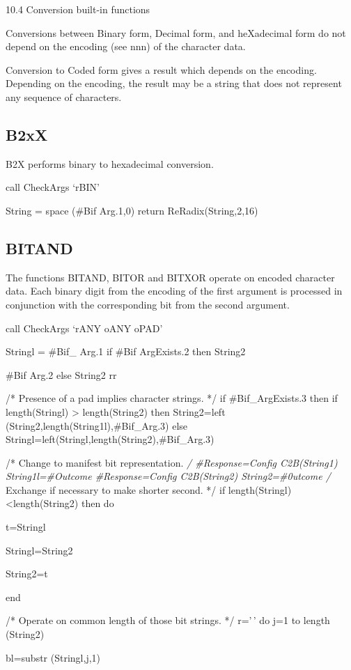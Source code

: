 10.4 Conversion built-in functions

Conversions between Binary form, Decimal form, and heXadecimal form do
not depend on the encoding (see nnn) of the character data.

Conversion to Coded form gives a result which depends on the encoding.
Depending on the encoding, the result may be a string that does not
represent any sequence of characters.

\subsection{B2xX}\label{b2xx}

B2X performs binary to hexadecimal conversion.

call CheckArgs `rBIN'

String = space (\#Bif Arg.1,0) return ReRadix(String,2,16)

\subsection{BITAND}\label{bitand}

The functions BITAND, BITOR and BITXOR operate on encoded character
data. Each binary digit from the encoding of the first argument is
processed in conjunction with the corresponding bit from the second
argument.

call CheckArgs `rANY oANY oPAD'

Stringl = \#Bif\_ Arg.1 if \#Bif ArgExists.2 then String2

\#Bif Arg.2 else String2 rr

/* Presence of a pad implies character strings. */ if \#Bif\_ArgExists.3
then if length(Stringl) \textgreater{} length(String2) then String2=left
(String2,length(String1l),\#Bif\_Arg.3) else
Stringl=left(Stringl,length(String2),\#Bif\_Arg.3)

/* Change to manifest bit representation. \emph{/ \#Response=Config
C2B(String1) String1l=\#Outcome \#Response=Config C2B(String2)
String2=\#0utcome /} Exchange if necessary to make shorter second. */ if
length(Stringl)\textless length(String2) then do

t=Stringl

Stringl=String2

String2=t

end

/* Operate on common length of those bit strings. */ r='\,' do j=1 to
length (String2)

bl=substr (Stringl,j,1)

